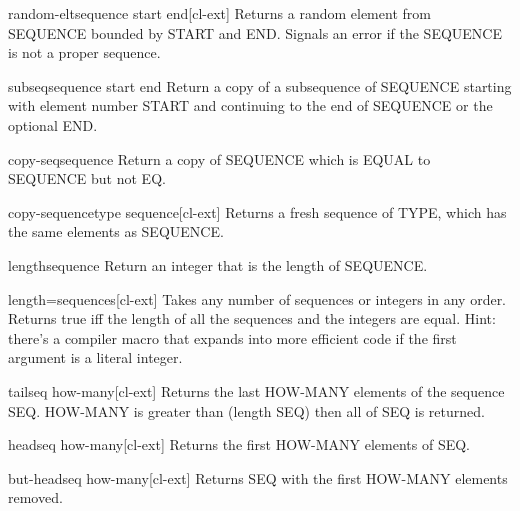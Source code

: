 \documentclass[10pt,english]{book}
\begin{document}
\begin{function}{random-elt}{sequence \key start end}[cl-ext]
  Returns a random element from SEQUENCE bounded by START and END.
  Signals an error if the SEQUENCE is not a proper sequence.
\end{function}

\begin{accessor}{subseq}{sequence start \op end}
  Return a copy of a subsequence of SEQUENCE starting with element number
  START and continuing to the end of SEQUENCE or the optional END.
\end{accessor}

\begin{function}{copy-seq}{sequence}
  Return a copy of SEQUENCE which is EQUAL to SEQUENCE but not EQ.
\end{function}

\begin{function}{copy-sequence}{type sequence}[cl-ext]
  Returns a fresh sequence of TYPE, which has the same elements as
  SEQUENCE.
\end{function}

\begin{function}{length}{sequence}
  Return an integer that is the length of SEQUENCE.
\end{function}

\begin{function}{length=}{\rest sequences}[cl-ext]
  Takes any number of sequences or integers in any order. Returns true
  iff the length of all the sequences and the integers are equal.
  Hint: there's a compiler macro that expands into more efficient code
  if the first argument is a literal integer.
\end{function}

\begin{function}{tail}{seq \op how-many}[cl-ext]
  Returns the last HOW-MANY elements of the sequence SEQ. HOW-MANY is
  greater than (length SEQ) then all of SEQ is returned.
\end{function}

\begin{function}{head}{seq \op how-many}[cl-ext]
  Returns the first HOW-MANY elements of SEQ.
\end{function}

\begin{function}{but-head}{seq \op how-many}[cl-ext]
  Returns SEQ with the first HOW-MANY elements removed.
\end{function}
\end{document}
